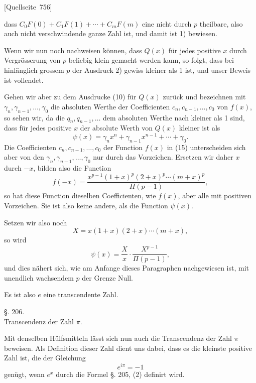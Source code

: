 \documentclass[11pt]{article}
\newcommand{\srcpage}[1]{\par\medskip\noindent\textsf{[Quellseite~#1]}\par\smallskip}
\begin{document}
\srcpage{756}
dass $C_0F(0)+C_1F(1)+\cdots+C_mF(m)$ eine nicht durch $p$ theilbare, also auch nicht verschwindende ganze Zahl ist, und damit ist 1) bewiesen.

Wenn wir nun noch nachweisen können, dass $Q(x)$ für jedes positive $x$ durch Vergrösserung von $p$ beliebig klein gemacht werden kann, so folgt, dass bei hinlänglich grossem $p$ der Ausdruck 2) gewiss kleiner als 1 ist, und unser Beweis ist vollendet.

Gehen wir aber zu dem Ausdrucke (10) für $Q(x)$ zurück und bezeichnen mit $\gamma_n,\gamma_{n-1},\ldots,\gamma_0$ die absoluten Werthe der Coefficienten $c_n,c_{n-1},\ldots,c_0$ von $f(x)$, so sehen wir, da die $q_n,q_{n-1},\ldots$ dem absoluten Werthe nach kleiner als 1 sind, dass für jedes positive $x$ der absolute Werth von $Q(x)$ kleiner ist als
\begin{equation}\tag{17}
\psi(x)=\gamma_nx^n+\gamma_{n-1}x^{n-1}+\cdots+\gamma_0.
\end{equation}
Die Coefficienten $c_n,c_{n-1},\ldots,c_0$ der Function $f(x)$ in (15) unterscheiden sich aber von den $\gamma_n,\gamma_{n-1},\ldots,\gamma_0$ nur durch das Vorzeichen. Ersetzen wir daher $x$ durch $-x$, bilden also die Function
\[
f(-x)=\frac{x^{p-1}(1+x)^p(2+x)^p\cdots(m+x)^p}{\Pi(p-1)},
\]
so hat diese Function dieselben Coefficienten, wie $f(x)$, aber alle mit positiven Vorzeichen. Sie ist also keine andere, als die Function $\psi(x)$.

Setzen wir also noch
\[
X=x(1+x)(2+x)\cdots(m+x),
\]
so wird
\begin{equation}\tag{18}
\psi(x)=\frac{X}{x}\cdot\frac{X^{p-1}}{\Pi(p-1)},
\end{equation}
und dies nähert sich, wie am Anfange dieses Paragraphen nachgewiesen ist, mit unendlich wachsendem $p$ der Grenze Null.

Es ist also $e$ eine transcendente Zahl.

\begin{center}
{\large §. 206.}\\[0.4em]
{\large Transcendenz der Zahl $\pi$.}
\end{center}

Mit denselben Hülfsmitteln lässt sich nun auch die Transcendenz der Zahl $\pi$ beweisen. Als Definition dieser Zahl dient uns dabei, dass es die kleinste positive Zahl ist, die der Gleichung
\begin{equation}\tag{1}
e^{i\pi}=-1
\end{equation}
genügt, wenn $e^x$ durch die Formel §. 205, (2) definirt wird.
\end{document}
